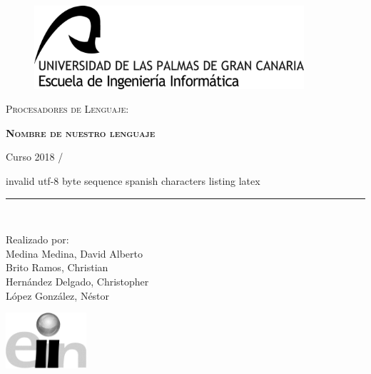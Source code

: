 \documentclass[11pt, english]{article}
\makeatletter
\newcounter{unomenos}
\gdef\@date{ Curso  2018 / \arabic{unomenos}}
\makeatother
\begin{document}
\begin{titlepage}

\begin{center}
\vspace*{-1in}
\begin{figure}[htb]
\begin{center}
\includegraphics[width=10cm]{../res/pics/logo.jpg}
\end{center}
\end{figure}

\vspace*{0.4in}
\begin{large}
\textsc{Procesadores de Lenguaje}:\\
\end{large}
\vspace*{0.2in}
\begin{Large}
\textbf{\textsc{Nombre de nuestro lenguaje}} \\
\end{Large}
\vspace*{0.3in}
\begin{large}
\@date\\
\end{large}
\vspace*{0.3in}invalid utf-8 byte sequence spanish characters listing latex
\rule{80mm}{0.1mm}\\
\vspace*{0.1in}
\begin{large}
Realizado por: \\

Medina Medina, David Alberto  \\
Brito Ramos, Christian  \\
Hernández Delgado, Christopher \\
López González, Néstor \\
\vspace*{0.3in}
\end{large}
\includegraphics[width=3cm]{../res/pics/LogoEscuela.jpg}
\end{center}
\end{titlepage}
\end{document}
